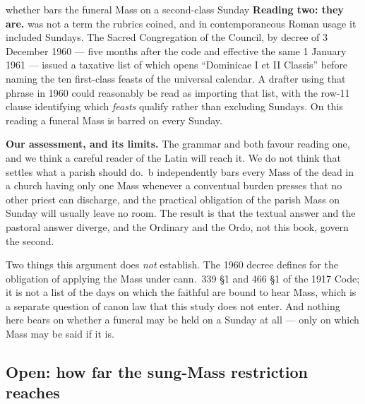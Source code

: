 \begin{contested}{whether  bars the funeral Mass on a second-class
Sunday}
\textbf{Reading two: they are.}  was not a term
the rubrics coined, and in contemporaneous Roman usage it included Sundays. The
Sacred Congregation of the Council, by decree of 3 December 1960 --- five months
after the code and effective the same 1 January 1961 --- issued a taxative list
of  which opens ``Dominicae I et II Classis'' before
naming the ten first-class feasts of the universal calendar. A drafter using
that phrase in 1960 could reasonably be read as importing that list, with the
row-11 clause identifying which \emph{feasts} qualify rather than excluding
Sundays. On this reading a funeral Mass is barred on every Sunday.

\textbf{Our assessment, and its limits.} The grammar and  both favour
reading one, and we think a careful reader of the Latin will reach it. We do
not think that settles what a parish should do. \,b independently bars
every Mass of the dead in a church having only one Mass whenever a conventual
burden presses that no other priest can discharge, and the practical obligation
of the parish Mass on Sunday will usually leave no room. The result is that the
textual answer and the pastoral answer diverge, and the Ordinary and the Ordo,
not this book, govern the second.

Two things this argument does \emph{not} establish. The 1960 decree defines
 for the obligation of applying the Mass
 under cann.~339 \S1 and 466 \S1 of the 1917 Code; it is not
a list of the days on which the faithful are bound to hear Mass, which is a
separate question of canon law that this study does not enter. And nothing
here bears on whether a funeral may be held on a Sunday at all --- only on
which Mass may be said if it is.
\end{contested}

\subsection{Open: how far the sung-Mass restriction reaches}

